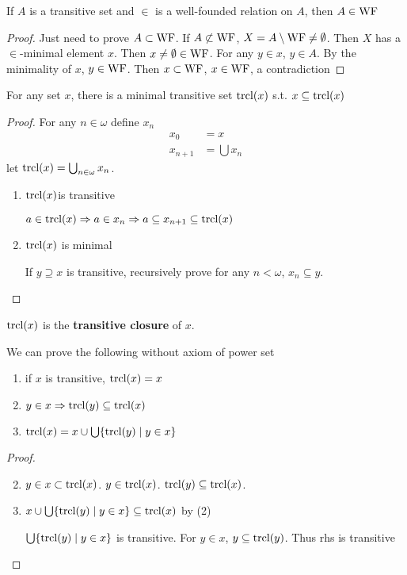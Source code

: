\documentclass[11pt]{article}
\begin{document}
\begin{lemma}[]
If \(A\) is a transitive set and \(\in\) is a well-founded relation on \(A\), then \(A\in\operatorname{WF}\)
\end{lemma}

\begin{proof}
Just need to prove \(A\subset\operatorname{WF}\). If \(A\not\subset\operatorname{WF}\), \(X=A\setminus\operatorname{WF}\neq\emptyset\). Then \(X\) has a \(\in\)-minimal
element \(x\). Then \(x\neq\emptyset\in\operatorname{WF}\). For any \(y\in x\), \(y\in A\). By the minimality
of \(x\), \(y\in\operatorname{WF}\). Then \(x\subset\operatorname{WF}\), \(x\in\operatorname{WF}\), a contradiction
\end{proof}

\begin{lemma}[]
For any set \(x\), there is a minimal transitive set \(\operatorname{\text{trcl}}(x)\) s.t. \(x\subseteq\operatorname{\text{trcl}}(x)\)
\end{lemma}

\begin{proof}
For any \(n\in\omega\) define \(x_n\)
\begin{align*}
x_0&=x\\
x_{n+1}&=\bigcup x_n
\end{align*}
let \(\operatorname{\text{trcl}}(x)=\bigcup_{n\in\omega}x_n\).
\begin{enumerate}
\item \(\operatorname{\text{trcl}}(x)\)is transitive

\(a\in\operatorname{\text{trcl}}(x)\Rightarrow a\in x_n\Rightarrow a\subseteq x_{n+1}\subseteq\operatorname{\text{trcl}}(x)\)
\item \(\operatorname{\text{trcl}}(x)\) is minimal

If \(y\supseteq x\) is transitive, recursively prove for any \(n<\omega\), \(x_n\subseteq y\).
\end{enumerate}
\end{proof}

\(\operatorname{\text{trcl}}(x)\) is the \textbf{transitive closure} of \(x\).

\begin{lemma}[]
We can prove the following without axiom of power set
\begin{enumerate}
\item if \(x\) is transitive, \(\operatorname{\text{trcl}}(x)=x\)
\item \(y\in x\Rightarrow\operatorname{\text{trcl}}(y)\subseteq\operatorname{\text{trcl}}(x)\)
\item \(\operatorname{\text{trcl}}(x)=x\cup\bigcup\{\operatorname{\text{trcl}}(y)\mid y\in x\}\)
\end{enumerate}
\end{lemma}

\begin{proof}
\begin{enumerate}
\setcounter{enumi}{1}
\item \(y\in x\subset\operatorname{\text{trcl}}(x)\). \(y\in\operatorname{\text{trcl}}(x)\). \(\operatorname{\text{trcl}}(y)\subseteq\operatorname{\text{trcl}}(x)\).
\item \(x\cup\bigcup\{\operatorname{\text{trcl}}(y)\mid y\in x\}\subseteq\operatorname{\text{trcl}}(x)\) by (2)

\(\bigcup\{\operatorname{\text{trcl}}(y)\mid y\in x\}\) is transitive. For \(y\in x\), \(y\subseteq\operatorname{\text{trcl}}(y)\). Thus rhs is transitive
\end{enumerate}
\end{proof}
\end{document}
